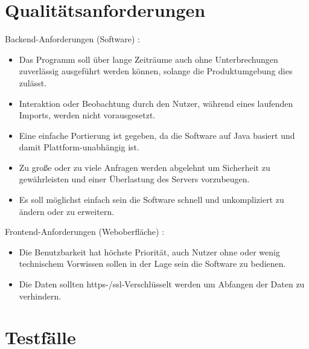 \documentclass[a4paper, 12 pt]{article}
\begin{document}
	\section{Qualitätsanforderungen}
	Backend-Anforderungen (Software) :
	\begin{itemize}
	\item Das Programm soll über lange Zeiträume auch ohne Unterbrechungen zuverlässig ausgeführt werden können, solange die Produktumgebung dies zulässt.
	\item Interaktion oder Beobachtung durch den Nutzer, während eines laufenden Imports, werden nicht vorausgesetzt.
	\item Eine einfache Portierung ist gegeben, da die Software auf Java basiert und damit Plattform-unabhängig ist. 
	\item Zu große oder zu viele Anfragen werden abgelehnt um Sicherheit zu gewährleisten und einer Überlastung des Servers vorzubeugen.
	\item Es soll möglichst einfach sein die Software schnell und unkompliziert zu ändern oder zu erweitern.
	\end{itemize}
	Frontend-Anforderungen (Weboberfläche) :
	\begin{itemize}
	\item Die Benutzbarkeit hat höchste Priorität, auch Nutzer ohne oder wenig technischem Vorwissen sollen in der Lage sein die Software zu bedienen.
	\item Die Daten sollten \gls{https}-/\gls{ssl}-Verschlüsselt werden um Abfangen der Daten zu verhindern.
	\end{itemize}
	

	\section{Testfälle}
	

	
	
\end{document}
